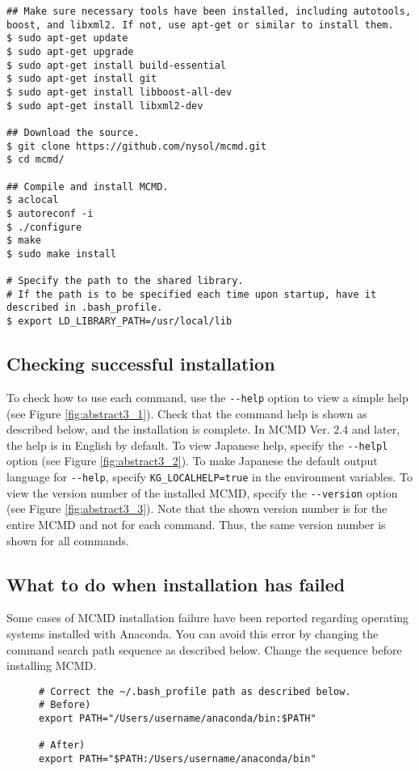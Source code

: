 \begin{Verbatim}[baselinestretch=0.7,frame=single]
## Make sure necessary tools have been installed, including autotools, boost, and libxml2. If not, use apt-get or similar to install them.
$ sudo apt-get update
$ sudo apt-get upgrade
$ sudo apt-get install build-essential
$ sudo apt-get install git
$ sudo apt-get install libboost-all-dev
$ sudo apt-get install libxml2-dev

## Download the source.
$ git clone https://github.com/nysol/mcmd.git
$ cd mcmd/

## Compile and install MCMD.
$ aclocal
$ autoreconf -i
$ ./configure 
$ make
$ sudo make install

# Specify the path to the shared library.
# If the path is to be specified each time upon startup, have it described in .bash_profile.
$ export LD_LIBRARY_PATH=/usr/local/lib
\end{Verbatim}

\subsection{Checking successful installation}
To check how to use each command, use the \verb|--help| option to view a simple help (see Figure \ref{fig:abstract3_1}). Check that the command help is shown as described below, and the installation is complete. In MCMD Ver. 2.4 and later, the help is in English by default. To view Japanese help, specify the \verb|--helpl| option (see Figure \ref{fig:abstract3_2}). To make Japanese the default output language for \verb|--help|, specify \verb|KG_LOCALHELP=true| in the environment variables. 
To view the version number of the installed MCMD, specify the \verb|--version| option (see Figure \ref{fig:abstract3_3}). Note that the shown version number is for the entire MCMD and not for each command. Thus, the same version number is shown for all commands.

\subsection{What to do when installation has failed}
Some cases of MCMD installation failure have been reported regarding operating systems installed with Anaconda. You can avoid this error by changing the command search path sequence as described below. Change the sequence before installing MCMD.

\begin{figure}[htbp]
\begin{Verbatim}[baselinestretch=0.7,frame=single]
# Correct the ~/.bash_profile path as described below.
# Before)
export PATH="/Users/username/anaconda/bin:$PATH"

# After)
export PATH="$PATH:/Users/username/anaconda/bin"
\end{Verbatim}
\end{figure}
\

